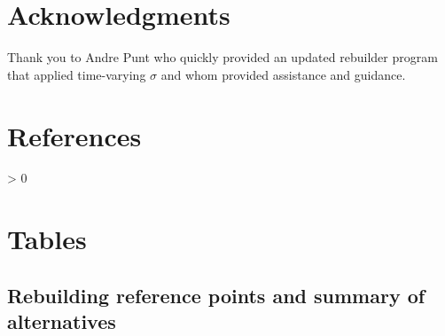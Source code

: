 \documentclass[11pt,
  english,
  a4paper,
]{article}
\newlength{\cslhangindent}
\newenvironment{CSLReferences}[2] %
 {%
  \setlength{\parindent}{0pt}
  \ifodd #1 \everypar{\setlength{\hangindent}{\cslhangindent}}\ignorespaces\fi
  \ifnum #2 > 0
  \setlength{\parskip}{#2\baselineskip}
  \fi
 }%
 {}
\begin{document}
\leavevmode\tagmcend\tagstructend\par


\hypertarget{acknowledgments}{%
\section{Acknowledgments}\label{acknowledgments}}

\leavevmode\tagmcend\tagstructend


Thank you to Andre Punt who quickly provided an updated rebuilder program that applied time-varying {\(\sigma\)\leavevmode\tagmcend\tagstructend} and whom provided assistance and guidance.

\leavevmode\tagmcend\tagstructend\par

\clearpage


\hypertarget{references}{%
\section{References}\label{references}}

\leavevmode\tagmcend\tagstructend


\hypertarget{refs}{}
\begin{CSLReferences}{0}{0}
\end{CSLReferences}

\leavevmode\tagmcend\tagstructend

\clearpage


\hypertarget{tables}{%
\section{Tables}\label{tables}}

\leavevmode\tagmcend\tagstructend


\hypertarget{rebuilding-reference-points-and-summary-of-alternatives}{%
\subsection{Rebuilding reference points and summary of alternatives}\label{rebuilding-reference-points-and-summary-of-alternatives}}
\end{document}
